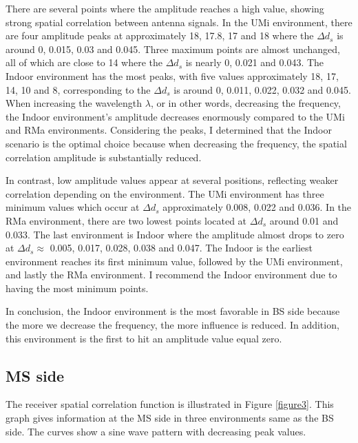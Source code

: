 \documentclass{article} %
\begin{document}
There are several points where the amplitude reaches a high value, showing strong spatial correlation between antenna signals. In the UMi environment, there are four amplitude peaks at approximately 18, 17.8, 17 and 18 where the $\Delta d_s$ is around 0, 0.015, 0.03 and 0.045. Three maximum points are almost unchanged, all of which are close to 14 where the $\Delta d_s$ is nearly 0, 0.021 and 0.043. The Indoor environment has the most peaks, with five values approximately 18, 17, 14, 10 and 8, corresponding to the $\Delta d_s$ is around 0, 0.011, 0.022, 0.032 and 0.045. When increasing the wavelength $\lambda$, or in other words, decreasing the frequency, the Indoor environment’s amplitude decreases enormously compared to the UMi and RMa environments. Considering the peaks, I determined that the Indoor scenario is the optimal choice because when decreasing the frequency, the spatial correlation amplitude is substantially reduced.

In contrast, low amplitude values appear at several positions, reflecting weaker correlation depending on the environment. The UMi environment has three minimum values which occur at $\Delta d_s$ approximately 0.008, 0.022 and 0.036. In the RMa environment, there are two lowest points located at $\Delta d_s$ around 0.01 and 0.033. The last environment is Indoor where the amplitude almost drops to zero at $\Delta d_s \approx$ 0.005, 0.017, 0.028, 0.038 and 0.047. The Indoor is the earliest environment reaches its first minimum value, followed by the UMi environment, and lastly the RMa environment. I recommend the Indoor environment due to having the most minimum points.

In conclusion, the Indoor environment is the most favorable in BS side because the more we decrease the frequency, the more influence is reduced. In addition, this environment is the first to hit an amplitude value equal zero.

\subsection{MS side}
The receiver spatial correlation function is illustrated in Figure \ref{figure3}. This graph gives information at the MS side in three environments same as the BS side. The curves show a sine wave pattern with decreasing peak values.
\end{document}
